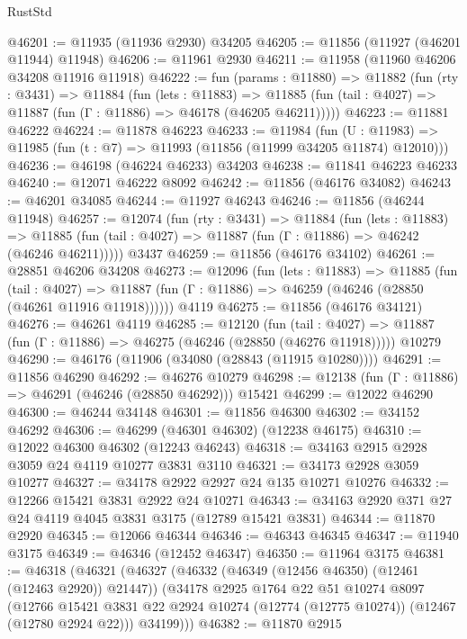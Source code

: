 \begin{lexlean}{RustStd}
\begin{coremodule}
@46201 := @11935 (@11936 @2930) @34205
@46205 := @11856 (@11927 (@46201 @11944) @11948)
@46206 := @11961 @2930
@46211 := @11958 (@11960 @46206 @34208 @11916 @11918)
@46222 := fun (params : @11880) =>
  @11882
    (fun (rty : @3431) =>
    @11884
      (fun (lets : @11883) =>
      @11885 (fun (tail : @4027) => @11887 (fun (Γ : @11886) => @46178 (@46205 @46211)))))
@46223 := @11881 @46222
@46224 := @11878 @46223
@46233 := @11984
    (fun (U : @11983) => @11985 (fun (t : @7) => @11993 (@11856 (@11999 @34205 @11874) @12010)))
@46236 := @46198 (@46224 @46233) @34203
@46238 := @11841 @46223 @46233
@46240 := @12071 @46222 @8092
@46242 := @11856 (@46176 @34082)
@46243 := @46201 @34085
@46244 := @11927 @46243
@46246 := @11856 (@46244 @11948)
@46257 := @12074
    (fun (rty : @3431) =>
    @11884
      (fun (lets : @11883) =>
      @11885 (fun (tail : @4027) => @11887 (fun (Γ : @11886) => @46242 (@46246 @46211)))))
    @3437
@46259 := @11856 (@46176 @34102)
@46261 := @28851 @46206 @34208
@46273 := @12096
    (fun (lets : @11883) =>
    @11885
      (fun (tail : @4027) =>
      @11887 (fun (Γ : @11886) => @46259 (@46246 (@28850 (@46261 @11916 @11918))))))
    @4119
@46275 := @11856 (@46176 @34121)
@46276 := @46261 @4119
@46285 := @12120
    (fun (tail : @4027) => @11887 (fun (Γ : @11886) => @46275 (@46246 (@28850 (@46276 @11918)))))
    @10279
@46290 := @46176 (@11906 (@34080 (@28843 (@11915 @10280))))
@46291 := @11856 @46290
@46292 := @46276 @10279
@46298 := @12138 (fun (Γ : @11886) => @46291 (@46246 (@28850 @46292))) @15421
@46299 := @12022 @46290
@46300 := @46244 @34148
@46301 := @11856 @46300
@46302 := @34152 @46292
@46306 := @46299 (@46301 @46302) (@12238 @46175)
@46310 := @12022 @46300 @46302 (@12243 @46243)
@46318 := @34163 @2915 @2928 @3059 @24 @4119 @10277 @3831 @3110
@46321 := @34173 @2928 @3059 @10277
@46327 := @34178 @2922 @2927 @24 @135 @10271 @10276
@46332 := @12266 @15421 @3831 @2922 @24 @10271
@46343 := @34163 @2920 @371 @27 @24 @4119 @4045 @3831 @3175 (@12789 @15421 @3831)
@46344 := @11870 @2920
@46345 := @12066 @46344
@46346 := @46343 @46345
@46347 := @11940 @3175
@46349 := @46346 (@12452 @46347)
@46350 := @11964 @3175
@46381 := @46318
    (@46321
      (@46327
        (@46332 (@46349 (@12456 @46350) (@12461 (@12463 @2920)) @21447))
        (@34178
          @2925
          @1764
          @22
          @51
          @10274
          @8097
          (@12766
            @15421
            @3831
            @22
            @2924
            @10274
            (@12774 (@12775 @10274))
            (@12467 (@12780 @2924 @22)))
          @34199)))
@46382 := @11870 @2915

\end{coremodule}
\end{lexlean}
